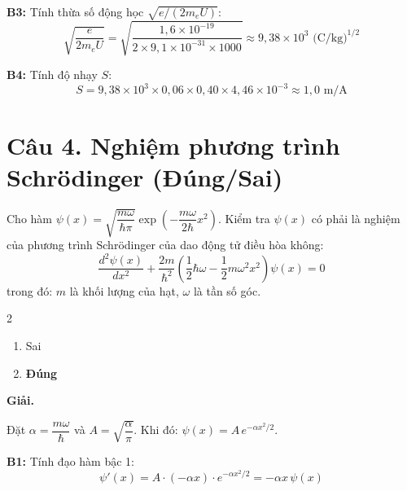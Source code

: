 \documentclass[11pt,a4paper]{article}
\begin{document}
\textbf{B3:} Tính thừa số động học $\sqrt{e/(2m_e U)}$:
\begin{equation*}
    \sqrt{\frac{e}{2m_e U}} = \sqrt{\frac{1{,}6 \times 10^{-19}}{2 \times 9{,}1 \times 10^{-31} \times 1000}} \approx 9{,}38 \times 10^{3} \text{ (C/kg)}^{1/2}
\end{equation*}

\textbf{B4:} Tính độ nhạy $S$:
\begin{equation*}
    S = 9{,}38 \times 10^{3} \times 0{,}06 \times 0{,}40 \times 4{,}46 \times 10^{-3} \approx 1{,}0 \text{ m/A}
\end{equation*}

\vspace{0.5cm}

\section*{Câu 4. Nghiệm phương trình Schrödinger (Đúng/Sai)}

Cho hàm $\psi(x) = \sqrt{\dfrac{m\omega}{\hbar\pi}} \exp\!\left(-\dfrac{m\omega}{2\hbar}x^2\right)$. Kiểm tra $\psi(x)$ có phải là nghiệm của phương trình Schrödinger của dao động tử điều hòa không:
\begin{equation*}
    \frac{d^2\psi(x)}{dx^2} + \frac{2m}{\hbar^2}\left(\frac{1}{2}\hbar\omega - \frac{1}{2}m\omega^2 x^2\right)\psi(x) = 0
\end{equation*}
trong đó: $m$ là khối lượng của hạt, $\omega$ là tần số góc.

\begin{multicols}{2}
\begin{enumerate}[label=\Alph*., itemsep=1pt, topsep=1pt, parsep=0pt, leftmargin=1.8em]
    \item Sai
    \item \textbf{Đúng}
\end{enumerate}
\end{multicols}

\textbf{Giải.}

Đặt $\alpha = \dfrac{m\omega}{\hbar}$ và $A = \sqrt{\dfrac{\alpha}{\pi}}$. Khi đó: $\psi(x) = A \, e^{-\alpha x^2/2}$.

\textbf{B1:} Tính đạo hàm bậc 1:
\begin{equation*}
    \psi'(x) = A \cdot (-\alpha x) \cdot e^{-\alpha x^2/2} = -\alpha x \, \psi(x)
\end{equation*}
\end{document}
